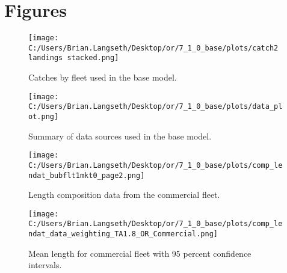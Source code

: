 \documentclass[11pt,
  english,
  a4paper,
]{article}
\begin{document}
\leavevmode\tagmcend\tagstructend\par

\newpage

\clearpage


\hypertarget{figures}{%
\section{Figures}\label{figures}}

\leavevmode\tagmcend\tagstructend


\begin{figure}
\centering
\texttt{[image: C:/Users/Brian.Langseth/Desktop/or/7\_1\_0\_base/plots/catch2 landings stacked.png]}
\caption{Catches by fleet used in the base model.\label{fig:catch}}
\end{figure}

\tagmcend\tagstructend


\begin{figure}
\centering
\texttt{[image: C:/Users/Brian.Langseth/Desktop/or/7\_1\_0\_base/plots/data\_plot.png]}
\caption{Summary of data sources used in the base model.\label{fig:data-plot}}
\end{figure}

\tagmcend\tagstructend


\begin{figure}
\centering
\texttt{[image: C:/Users/Brian.Langseth/Desktop/or/7\_1\_0\_base/plots/comp\_lendat\_bubflt1mkt0\_page2.png]}
\caption{Length composition data from the commercial fleet.\label{fig:com-len-data}}
\end{figure}

\tagmcend\tagstructend


\begin{figure}
\centering
\texttt{[image: C:/Users/Brian.Langseth/Desktop/or/7\_1\_0\_base/plots/comp\_lendat\_data\_weighting\_TA1.8\_OR\_Commercial.png]}
\caption{Mean length for commercial fleet with 95 percent confidence intervals.\label{fig:mean-com-len-data}}
\end{figure}
\end{document}
